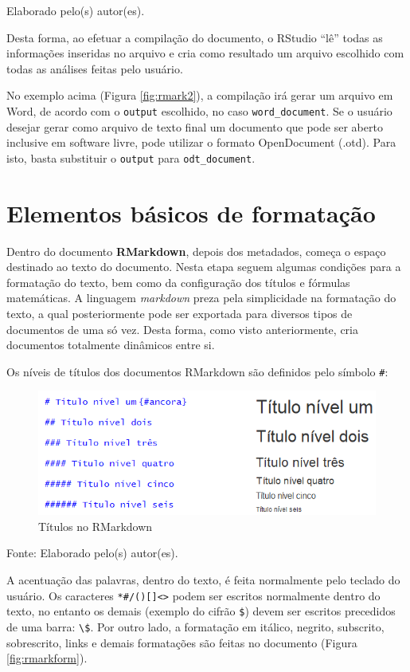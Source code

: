 \documentclass[12pt,brazil,]{book}
\begin{document}
Elaborado pelo(s) autor(es).

Desta forma, ao efetuar a compilação do documento, o RStudio ``lê''
todas as informações inseridas no arquivo e cria como resultado um
arquivo escolhido com todas as análises feitas pelo usuário.

No exemplo acima (Figura \ref{fig:rmark2}), a compilação irá gerar um
arquivo em Word, de acordo com o \texttt{output} escolhido, no caso
\texttt{word\_document}. Se o usuário desejar gerar como arquivo de
texto final um documento que pode ser aberto inclusive em software
livre, pode utilizar o formato OpenDocument (.otd). Para isto, basta
substituir o \texttt{output} para \texttt{odt\_document}.

\hypertarget{elementos-basicos-de-formatacao}{%
\section{Elementos básicos de
formatação}\label{elementos-basicos-de-formatacao}}

Dentro do documento \textbf{RMarkdown}, depois dos metadados, começa o
espaço destinado ao texto do documento. Nesta etapa seguem algumas
condições para a formatação do texto, bem como da configuração dos
títulos e fórmulas matemáticas. A linguagem \emph{markdown} preza pela
simplicidade na formatação do texto, a qual posteriormente pode ser
exportada para diversos tipos de documentos de uma só vez. Desta forma,
como visto anteriormente, cria documentos totalmente dinâmicos entre si.

Os níveis de títulos dos documentos RMarkdown são definidos pelo símbolo
\texttt{\#}:

\begin{figure}

{\centering \includegraphics[width=0.6\linewidth]{rmarktit} 

}

\caption{Títulos no RMarkdown}\label{fig:rmarktit}
\end{figure}

Fonte: Elaborado pelo(s) autor(es).

A acentuação das palavras, dentro do texto, é feita normalmente pelo
teclado do usuário. Os caracteres
\texttt{*\#/(){[}{]}\textless{}\textgreater{}} podem ser escritos
normalmente dentro do texto, no entanto os demais (exemplo do cifrão
\texttt{\$}) devem ser escritos precedidos de uma barra:
\texttt{\textbackslash{}\$}. Por outro lado, a formatação em itálico,
negrito, subscrito, sobrescrito, links e demais formatações são feitas
no documento (Figura \ref{fig:rmarkform}).
\end{document}

